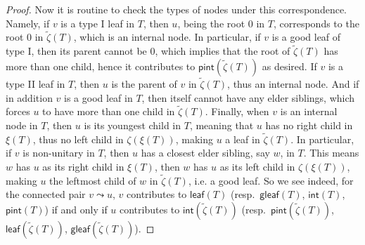 \documentclass[reqno]{amsart}
\numberwithin{equation}{section}
\theoremstyle{definition}
\theoremstyle{named}
\newcommand{\curly}{\mathrel{\leadsto}}
\def\leaf{\mathsf{leaf}}
\def\gleaf{\mathsf{gleaf}}
\def\int{\mathsf{int}}
\def\pint{\mathsf{pint}}
\begin{document}
\begin{proof}
Now it is routine to check the types of nodes under this correspondence. Namely, if $v$ is a type I leaf in $T$, then $u$, being the root $0$ in $T$, corresponds to the root $0$ in $\widetilde{\zeta}(T)$, which is an internal node. In particular, if $v$ is a good leaf of type I, then its parent cannot be $0$, which implies that the root of $\widetilde{\zeta}(T)$ has more than one child, hence it contributes to $\pint(\widetilde{\zeta}(T))$ as desired. If $v$ is a type II leaf in $T$, then $u$ is the parent of $v$ in $\widetilde{\zeta}(T)$, thus an internal node. And if in addition $v$ is a good leaf in $T$, then itself cannot have any elder siblings, which forces $u$ to have more than one child in $\widetilde{\zeta}(T)$. Finally, when $v$ is an internal node in $T$, then $u$ is its youngest child in $T$, meaning that $u$ has no right child in $\xi(T)$, thus no left child in $\zeta(\xi(T))$, making $u$ a leaf in $\widetilde{\zeta}(T)$. In particular, if $v$ is non-unitary in $T$, then $u$ has a closest elder sibling, say $w$, in $T$. This means $w$ has $u$ as its right child in $\xi(T)$, then $w$ has $u$ as its left child in $\zeta(\xi(T))$, making $u$ the leftmost child of $w$ in $\widetilde{\zeta}(T)$, i.e. a good leaf. So we see indeed, for the connected pair $v\curly u$, $v$ contributes to $\leaf(T)$ (resp.~$\gleaf(T)$, $\int(T)$, $\pint(T)$) if and only if $u$ contributes to $\int(\widetilde{\zeta}(T))$ (resp.~$\pint(\widetilde{\zeta}(T))$, $\leaf(\widetilde{\zeta}(T))$, $\gleaf(\widetilde{\zeta}(T))$).

\end{proof}
\end{document}
